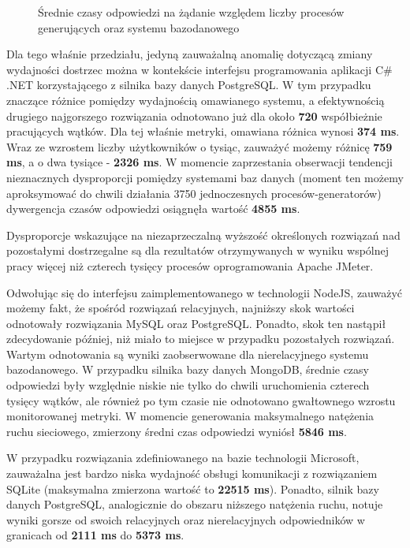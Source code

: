 \begin{figure}[H]
\begin{tabular}{@{}ll@{}}
	\end{tabular}
  \caption{Średnie czasy odpowiedzi na żądanie względem liczby procesów generujących oraz systemu bazodanowego}
  \label{fig:response-mtc-1}
\end{figure}

Dla tego właśnie przedziału, jedyną zauważalną anomalię dotyczącą zmiany wydajności dostrzec można w kontekście interfejsu programowania aplikacji C\# .NET korzystającego z silnika bazy danych PostgreSQL. W tym przypadku znaczące różnice pomiędzy wydajnością omawianego systemu, a efektywnością drugiego najgorszego rozwiązania odnotowano już dla około \textbf{720} współbieżnie pracujących wątków. Dla tej właśnie metryki, omawiana różnica wynosi \textbf{374 ms}. Wraz ze wzrostem liczby użytkowników o tysiąc, zauważyć możemy różnicę \textbf{759 ms}, a o dwa tysiące - \textbf{2326 ms}. W momencie zaprzestania obserwacji tendencji nieznacznych dysproporcji pomiędzy systemami baz danych (moment ten możemy aproksymować do chwili działania 3750 jednoczesnych procesów-generatorów) dywergencja czasów odpowiedzi osiągnęła wartość \textbf{4855 ms}.

Dysproporcje wskazujące na niezaprzeczalną wyższość określonych rozwiązań nad pozostałymi dostrzegalne są dla rezultatów otrzymywanych w wyniku wspólnej pracy więcej niż czterech tysięcy procesów oprogramowania Apache JMeter. 

Odwołując się do interfejsu zaimplementowanego w technologii NodeJS, zauważyć możemy fakt, że spośród rozwiązań relacyjnych, najniższy skok wartości odnotowały rozwiązania MySQL oraz PostgreSQL. Ponadto, skok ten nastąpił zdecydowanie później, niż miało to miejsce w przypadku pozostałych rozwiązań. Wartym odnotowania są wyniki zaobserwowane dla nierelacyjnego systemu bazodanowego. W przypadku silnika bazy danych MongoDB, średnie czasy odpowiedzi były względnie niskie nie tylko do chwili uruchomienia czterech tysięcy wątków, ale również po tym czasie nie odnotowano gwałtownego wzrostu monitorowanej metryki. W momencie generowania maksymalnego natężenia ruchu sieciowego, zmierzony średni czas odpowiedzi wyniósł \textbf{5846 ms}.

W przypadku rozwiązania zdefiniowanego na bazie technologii Microsoft, zauważalna jest bardzo niska wydajność obsługi komunikacji z rozwiązaniem SQLite (maksymalna zmierzona wartość to \textbf{22515 ms}). Ponadto, silnik bazy danych PostgreSQL, analogicznie do obszaru niższego natężenia ruchu, notuje wyniki gorsze od swoich relacyjnych oraz nierelacyjnych odpowiedników w granicach od \textbf{2111 ms} do \textbf{5373 ms}.

